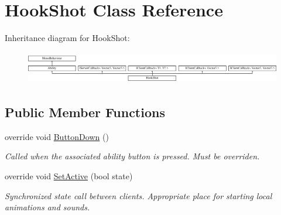\hypertarget{class_hook_shot}{}\section{Hook\+Shot Class Reference}
\label{class_hook_shot}
Inheritance diagram for Hook\+Shot\+:\begin{figure}[H]
\begin{center}
\leavevmode
\includegraphics[height=1.435897cm]{class_hook_shot}
\end{center}
\end{figure}
\subsection*{Public Member Functions}
\begin{DoxyCompactItemize}
\item 
override void \hyperlink{class_hook_shot_a73e3191ef5ef7910106a40e2fa508503}{Button\+Down} ()
\begin{DoxyCompactList}\small\item\em Called when the associated ability button is pressed. Must be overriden. \end{DoxyCompactList}\item 
override void \hyperlink{class_hook_shot_a0b3f1e1b2b5bd9e75ba533c5a477fe7f}{Set\+Active} (bool state)
\begin{DoxyCompactList}\small\item\em Synchronized state call between clients. Appropriate place for starting local animations and sounds. \end{DoxyCompactList}\end{DoxyCompactItemize}
